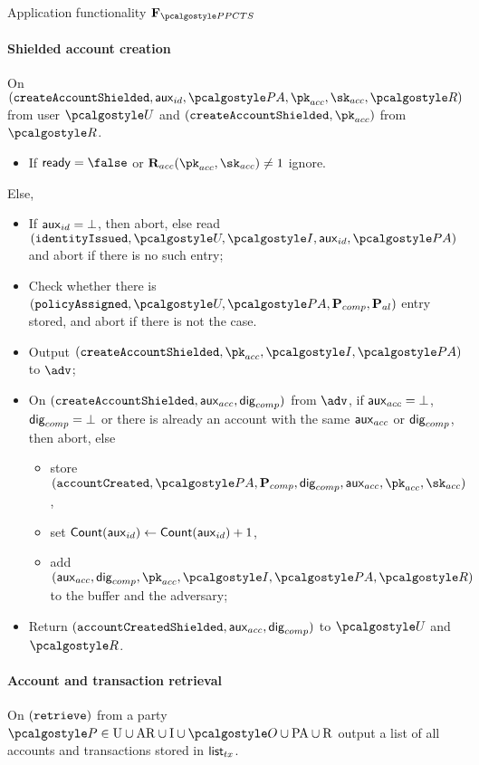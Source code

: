 \documentclass[runningheads,10pt]{llncs}
\numberwithin{equation}{section}
\begin{document}
\begin{funcbox}{Application functionality $\func{\PPCTS}$}
  \paragraph{Shielded account creation}
  On $(\createAccountShielded, \auxid, \polas, \pkacc, \skacc,   \relay)$ from
  user $\user$ and $(\createAccountShielded, \pkacc)$ from $\relay$.
  \begin{itemize}
  \item If $\ready = \false$ or $\RELacc (\pkacc, \skacc) \neq 1$ ignore.
  \end{itemize}
  Else,
  \begin{itemize}
  \item If $\mathsf{aux}_{id} = \bot$, then abort, else read $(\identityIssued, \user,
    \idprov, \auxid, \polas)$ and abort if there is no such entry;
  \item Check whether there is $(\policyAssigned, \user, \polas,
      \comppolicy, \alpolicy)$ entry stored, and abort if there is not the case.
  \item Output $(\createAccountShielded, \pkacc, \idprov, \polas)$ to $\adv$;
  \item On $(\mathtt{createAccountShielded}, \mathsf{aux}_{acc}, \mathsf{dig}_{comp})$ from $\adv$, if $\mathsf{aux}_{acc} =
    \bot$, $\mathsf{dig}_{comp} = \bot$ or there is already an account with the same
    $\mathsf{aux}_{acc}$ or $\mathsf{dig}_{comp}$, then abort, else
    \begin{itemize}
    \item store $(\accountCreated, \polas, \comppolicy, \policydig,
      \auxacc, \pkacc, \skacc)$,
    \item set $\mathsf{Count}(\mathsf{aux}_{id}) \gets \mathsf{Count}(\mathsf{aux}_{id}) + 1$,
    \item add $(\auxacc, \policydig, \pkacc, \idprov, \polas, \relay)$
      to the buffer and the adversary;
    \end{itemize}
  \item Return $(\mathtt{accountCreatedShielded}, \mathsf{aux}_{acc}, \mathsf{dig}_{comp})$ to $\user$ and $\relay$.
\end{itemize}

  \paragraph{Account and transaction retrieval}
  On $(\mathtt{retrieve})$ from a party $\party \in \partyset{U} \cup \partyset{AR}
  \cup \partyset{I} \cup \owner \cup \partyset{PA} \cup \partyset{R}$ output a
  list of all accounts and transactions stored in ${\mathsf{list}_{tx}}$.


\end{funcbox}
\end{document}
